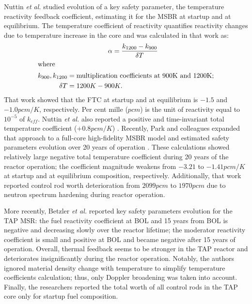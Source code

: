 Nuttin \emph{et al.} studied evolution of a key safety parameter, the 
temperature 
reactivity feedback coefficient, estimating it for the \gls{MSBR} at startup 
and at equilibrium. The temperature coefficient of reactivity quantifies 
reactivity changes due to temperature increase in the core and was calculated 
in that 
work as:
\begin{align}\label{eq:feedback}
	& \qquad\qquad\qquad \alpha = \frac{k_{1200} - k_{900}}{\delta 
	T} \\
	\intertext{where}
	k_{900}, k_{1200}  &= \mbox{multiplication coefficients at 900K and 
		1200K;} 
	\nonumber \\
	\delta T &= 1200K-900K.\nonumber
\end{align}
That work showed that the \gls{FTC} at startup and at equilibrium is $-1.5$ 
and $-1.0pcm/K$, respectively. Per cent mille ($pcm$) is the unit of 
reactivity equal to $10^{-5}$ of $k_{eff}$. Nuttin \emph{et al.} also reported 
a positive and time-invariant total temperature coefficient ($+0.8pcm/K$) 
\cite{nuttin_potential_2005}. Recently, Park and colleagues expanded that 
approach to a full-core high-fidelity \gls{MSBR} model and estimated safety 
parameters evolution over 20 years of operation \cite{park_whole_2015}. These 
calculations showed relatively large negative total temperature coefficient 
during 20 years of the reactor operation; the coefficient magnitude weakens 
from $-3.21$ to $-1.41pcm/K$ at startup and at equilibrium composition, 
respectively. Additionally, that work reported control rod worth deterioration 
from $2099pcm$ to $1970pcm$ due to neutron spectrum hardening during reactor 
operation. 

More recently, Betzler \emph{et al.} \cite{betzler_assessment_2017-1} reported 
key safety parameters evolution for the \gls{TAP} \gls{MSR}: the fuel 
reactivity coefficient at \gls{BOL} and 15 years from \gls{BOL} is negative 
and decreasing slowly over the reactor lifetime; the moderator reactivity 
coefficient is small and positive at \gls{BOL} and became negative after 15 
years of operation. Overall, thermal feedback seems to be stronger in the 
\gls{TAP} reactor and deteriorates insignificantly during the reactor 
operation. Notably, the authors ignored material density change with 
temperature to simplify temperature coefficients calculation; thus, only  
Doppler broadening was taken into account. Finally, the researchers reported 
the total worth of all control rods in the \gls{TAP} core only for startup 
fuel composition. 

